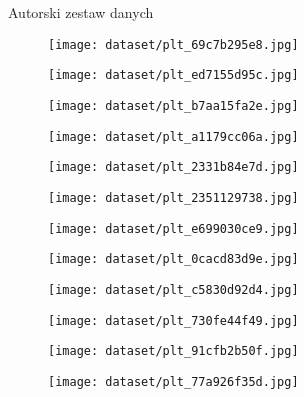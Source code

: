 \begin{easyappendix}{Autorski zestaw danych}

    \begin{figure}[H]
        \centering
        \texttt{[image: dataset/plt\_69c7b295e8.jpg]}
    \end{figure}
    \begin{figure}[H]
        \centering
        \texttt{[image: dataset/plt\_ed7155d95c.jpg]}
    \end{figure}
    \begin{figure}[H]
        \centering
        \texttt{[image: dataset/plt\_b7aa15fa2e.jpg]}
    \end{figure}
    \begin{figure}[H]
        \centering
        \texttt{[image: dataset/plt\_a1179cc06a.jpg]}
    \end{figure}
    \begin{figure}[H]
        \centering
        \texttt{[image: dataset/plt\_2331b84e7d.jpg]}
    \end{figure}
    \begin{figure}[H]
        \centering
        \texttt{[image: dataset/plt\_2351129738.jpg]}
    \end{figure}
    \begin{figure}[H]
        \centering
        \texttt{[image: dataset/plt\_e699030ce9.jpg]}
    \end{figure}
    \begin{figure}[H]
        \centering
        \texttt{[image: dataset/plt\_0cacd83d9e.jpg]}
    \end{figure}
    \begin{figure}[H]
        \centering
        \texttt{[image: dataset/plt\_c5830d92d4.jpg]}
    \end{figure}
    \begin{figure}[H]
        \centering
        \texttt{[image: dataset/plt\_730fe44f49.jpg]}
    \end{figure}
    \begin{figure}[H]
        \centering
        \texttt{[image: dataset/plt\_91cfb2b50f.jpg]}
    \end{figure}
    \begin{figure}[H]
        \centering
        \texttt{[image: dataset/plt\_77a926f35d.jpg]}

\end{figure}
\end{easyappendix}
